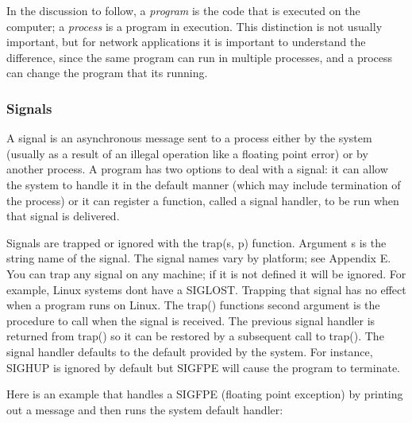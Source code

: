 In the discussion to follow, a \textit{program} is the code that is
executed on the computer; a \textit{process}\textit{ }is
a program in execution. This distinction is not usually important, but
for network applications it is important to understand the difference,
since the same program can run in multiple processes, and a process can
change the program that it{\textquotesingle}s running.

\subsubsection{Signals}
A signal is an asynchronous message sent to a process
either by the system (usually as a result of an illegal operation like
a floating point error) or by another
process. A program has two options to deal with a signal: it can allow
the system to handle it in the default manner (which may include
termination of the process) or it can register a function, called a
signal handler, to be run when that signal is delivered.

Signals are trapped or ignored with the \textsf{trap(s, p)} function.
Argument \textsf{s} is the string name of the signal. The signal names
vary by platform; see Appendix E. You can trap any signal on any
machine; if it is not defined it will be ignored. For example, Linux
systems don{\textquotesingle}t have a \textsf{SIGLOST.} Trapping that
signal has no effect when a program runs on Linux. The \textsf{trap()}
function{\textquotesingle}s second argument is the procedure to call
when the signal is received. The previous signal handler is returned
from \textsf{trap()} so it can be restored by a
subsequent call to \textsf{trap()}. The signal handler defaults to the
default provided by the system. For instance, \textsf{SIGHUP} is
ignored by default but \textsf{SIGFPE} will cause the program to
terminate.

Here is an example that handles a \textsf{SIGFPE} (floating point
exception) by printing out a message and then runs the system default
handler:


